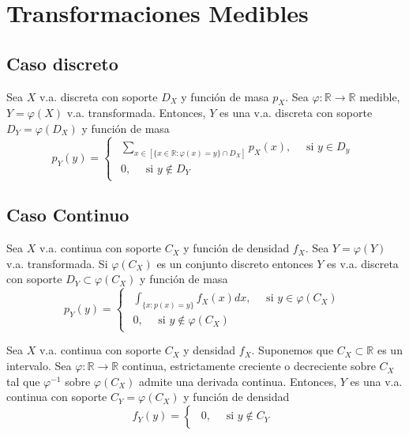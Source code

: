 \section{Transformaciones Medibles}

\subsection{Caso discreto}

\begin{theo}
  Sea $X$ v.a. discreta con soporte $D_{X}$ y función de masa $p_{X}$. Sea $\varphi :  \mathbb{R} \to \mathbb{R}$ medible, $Y = \varphi(X)$ v.a. transformada. Entonces, $Y$ es una v.a. discreta con soporte $D_{Y} = \varphi(D_{X})$ y función de masa
  \[ 
    p_{Y}(y)  =
    \begin{cases}
      \begin{aligned}
        \sum_{x \in [\{ x \in \mathbb{R} : \varphi(x) = y \} \cap D_{X}]} p_{X}(x), \quad \text{ si } y \in D_{y} \\
      0, \quad \text{ si } y \not \in D_{Y}
      \end{aligned}
    \end{cases} 
  \] 
\end{theo}

\subsection{Caso Continuo}

\begin{theo}
  Sea $X$ v.a. continua con soporte $C_{X}$ y función de densidad $f_{X}$. Sea $Y = \varphi(Y)$ v.a. transformada. Si $\varphi(C_{X})$ es un conjunto discreto entonces $Y$ es v.a. discreta con soporte $D_{Y} \subset \varphi(C_{X})$ y función de masa
  \[ 
    p_{Y}(y)  =
    \begin{cases}
      \begin{aligned}
        \int_{\{ x : p(x) = y \}}^{} f_{X}(x) dx, \quad \text{ si } y \in \varphi(C_{X}) \\
        0, \quad \text{ si } y \not \in \varphi(C_{X})
      \end{aligned}
    \end{cases} 
  \] 
\end{theo}

\begin{theo}
  Sea $X$ v.a. continua con soporte $C_{X}$ y densidad $f_{X}$. Suponemos que $ C_{X} \subset \mathbb{R}$ es un intervalo. Sea $\varphi :  \mathbb{R} \to \mathbb{R}$ continua, estrictamente creciente o decreciente sobre $C_{X}$ tal que $\varphi^{-1}$ sobre $\varphi(C_{X})$ admite una derivada continua. Entonces, $Y$ es una v.a. continua con soporte $C_{Y} = \varphi(C_{X})$ y función de densidad
  \[ 
    f_{Y}(y) = 
    \begin{cases}
      \begin{aligned}
        
        0, \quad \text{ si } y \not \in C_{Y}
      \end{aligned}
    \end{cases} 
  \] 
\end{theo}

